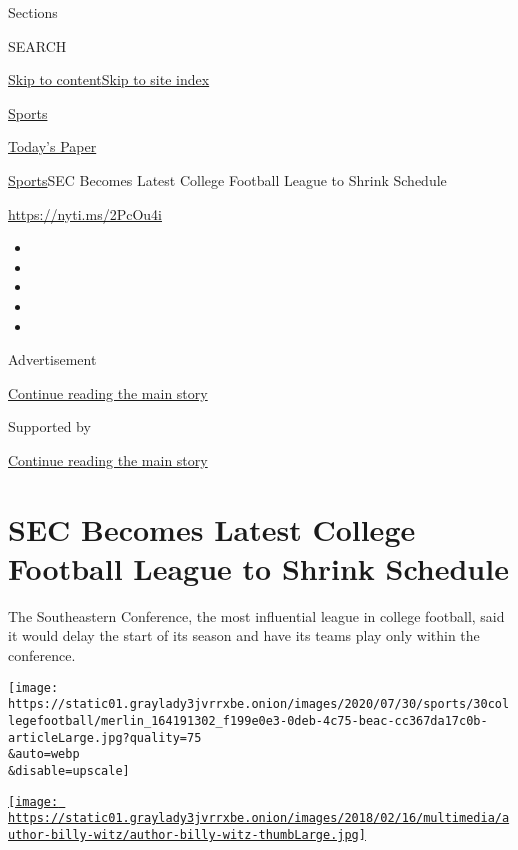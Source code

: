 Sections

SEARCH

\protect\hyperlink{site-content}{Skip to
content}\protect\hyperlink{site-index}{Skip to site index}

\href{https://www.nytimes3xbfgragh.onion/section/sports}{Sports}

\href{https://myaccount.nytimes3xbfgragh.onion/auth/login?response_type=cookie\&client_id=vi}{}

\href{https://www.nytimes3xbfgragh.onion/section/todayspaper}{Today's
Paper}

\href{/section/sports}{Sports}\textbar{}SEC Becomes Latest College
Football League to Shrink Schedule

\url{https://nyti.ms/2PcOu4i}

\begin{itemize}
\item
\item
\item
\item
\item
\end{itemize}

Advertisement

\protect\hyperlink{after-top}{Continue reading the main story}

Supported by

\protect\hyperlink{after-sponsor}{Continue reading the main story}

\hypertarget{sec-becomes-latest-college-football-league-to-shrink-schedule}{%
\section{SEC Becomes Latest College Football League to Shrink
Schedule}\label{sec-becomes-latest-college-football-league-to-shrink-schedule}}

The Southeastern Conference, the most influential league in college
football, said it would delay the start of its season and have its teams
play only within the conference.

\texttt{[image: https://static01.graylady3jvrrxbe.onion/images/2020/07/30/sports/30collegefootball/merlin\_164191302\_f199e0e3-0deb-4c75-beac-cc367da17c0b-articleLarge.jpg?quality=75\\\&auto=webp\\\&disable=upscale]}

\href{https://www.nytimes3xbfgragh.onion/by/billy-witz}{\texttt{[image: https://static01.graylady3jvrrxbe.onion/images/2018/02/16/multimedia/author-billy-witz/author-billy-witz-thumbLarge.jpg]}}

